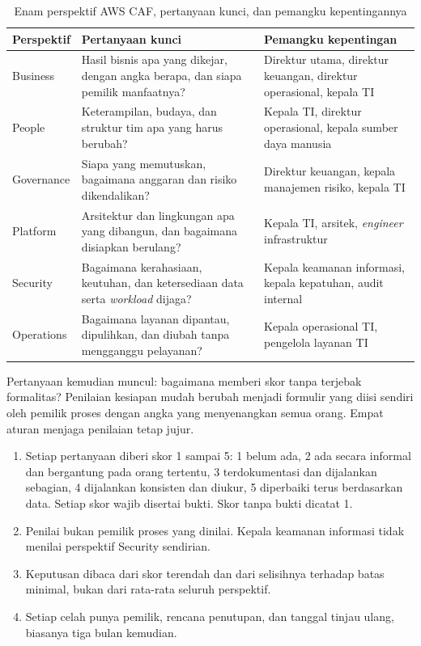 \begin{table}[!htb]
  \centering
  \footnotesize
  \caption{Enam perspektif AWS CAF, pertanyaan kunci, dan pemangku kepentingannya}
  \label{tab:ch04-enam-perspektif}
  \begin{tabularx}{\textwidth}{>{\raggedright\arraybackslash}p{1.7cm}
                               >{\raggedright\arraybackslash}X
                               >{\raggedright\arraybackslash}p{3.4cm}}
    \hline
    \textbf{Perspektif} & \textbf{Pertanyaan kunci} & \textbf{Pemangku kepentingan} \\
    \hline
    Business & Hasil bisnis apa yang dikejar, dengan angka berapa, dan siapa pemilik
      manfaatnya? & Direktur utama, direktur keuangan, direktur operasional, kepala TI \\
    \hline
    People & Keterampilan, budaya, dan struktur tim apa yang harus berubah? & Kepala TI,
      direktur operasional, kepala sumber daya manusia \\
    \hline
    Governance & Siapa yang memutuskan, bagaimana anggaran dan risiko dikendalikan? &
      Direktur keuangan, kepala manajemen risiko, kepala TI \\
    \hline
    Platform & Arsitektur dan lingkungan apa yang dibangun, dan bagaimana disiapkan
      berulang? & Kepala TI, arsitek, \textit{engineer} infrastruktur \\
    \hline
    Security & Bagaimana kerahasiaan, keutuhan, dan ketersediaan data serta
      \textit{workload} dijaga? & Kepala keamanan informasi, kepala kepatuhan, audit
      internal \\
    \hline
    Operations & Bagaimana layanan dipantau, dipulihkan, dan diubah tanpa mengganggu
      pelayanan? & Kepala operasional TI, pengelola layanan TI \\
    \hline
  \end{tabularx}
\end{table}

Pertanyaan kemudian muncul: bagaimana memberi skor tanpa terjebak formalitas? Penilaian
kesiapan mudah berubah menjadi formulir yang diisi sendiri oleh pemilik proses dengan
angka yang menyenangkan semua orang. Empat aturan menjaga penilaian tetap jujur.
\begin{enumerate}
  \item Setiap pertanyaan diberi skor 1 sampai 5: 1 belum ada, 2 ada secara informal dan
        bergantung pada orang tertentu, 3 terdokumentasi dan dijalankan sebagian, 4
        dijalankan konsisten dan diukur, 5 diperbaiki terus berdasarkan data. Setiap skor
        wajib disertai bukti. Skor tanpa bukti dicatat 1.
  \item Penilai bukan pemilik proses yang dinilai. Kepala keamanan informasi tidak menilai
        perspektif Security sendirian.
  \item Keputusan dibaca dari skor terendah dan dari selisihnya terhadap batas minimal,
        bukan dari rata-rata seluruh perspektif.
  \item Setiap celah punya pemilik, rencana penutupan, dan tanggal tinjau ulang, biasanya
        tiga bulan kemudian.
\end{enumerate}

